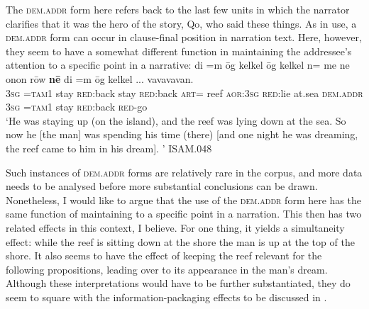 \documentclass[output=paper
,modfonts
,nonflat]{langsci/langscibook}
\begin{document}
\noindent
The \textsc{dem.addr} form here refers back to the last few  units in which the narrator clarifies that it was the hero of the story, Qo{\textquotesingle}, who said these things. As in  use, a \textsc{dem.addr} form can occur in clause-final position in narration text. Here, however, they seem to have a somewhat different function in maintaining the addressee's attention to a specific point in a narrative:
\ea	\label{ex45}
\gll		di		=m 		{\textquotesingle}\=og 	kelkel 		{\textquotesingle}\=og 	kelkel 		n= 	me{\textquotesingle} 	ne 		onon 	r\=ow 		\textbf{n\=e{\textquotesingle}}	di	=m {\textquotesingle}\=og kelkel {\ob}...{\cb} vavavavan.	\\
	\textsc{3sg}	\textsc{=tam1}	stay	\textsc{red:}back		stay	\textsc{red:}back		\textsc{art=}	reef	\textsc{aor:3sg}	\textsc{red:}lie	at.sea		\textsc{dem.addr}	\textsc{3sg}	\textsc{=tam1}	stay	\textsc{red:}back	{}	\textsc{red-}go		\\
\glt	`He was staying up (on the island), and the reef was lying down at the sea. So now he [the man] was spending his time (there) [and one night he was dreaming, the reef came to him in his dream]. '			\hfill{ISAM.048}
\z

\noindent
Such instances of \textsc{dem.addr} forms are relatively rare in the corpus, and more data needs to be analysed before more substantial conclusions can be drawn. Nonetheless, I would like to argue that the use of the \textsc{dem.addr} form here has the same function of maintaining  to a specific point in a narration. This then has two related effects in this context, I believe. For one thing, it yields a simultaneity effect: while the reef is sitting down at the shore the man is up at the top of the shore. It also seems to have the effect of keeping the reef relevant for the following propositions, leading over to its appearance in the man's dream. Although these interpretations would have to be further substantiated, they do seem to square with the information-packaging effects to be discussed in .
\end{document}
